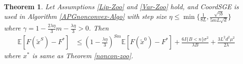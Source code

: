\documentclass{article}
\newcommand*{\E}{\mathbb{E}}
\newtheorem{theorem}{Theorem}[section]
\theoremstyle{definition}
\theoremstyle{remark}
\begin{document}
\begin{theorem}\label{PL-Zoo}
Let Assumptions \ref{Lip-Zoo} and \ref{Var-Zoo} hold, and  CoordSGE  is  used  in
 Algorithm \ref{APGnonconvex-Algo} with step size $\eta \leq \min\{\frac{1}{8L}, \frac{\sqrt{\gamma b}}{5 m L \sqrt{d}}\}$ where $\gamma = 1-\frac{2\lambda\eta}{3} m-\frac{\lambda\eta}{3} > 0$. Then 
\begin{equation}\label{PL-eq-error}
\begin{split}
\E[F(\tilde{x}^S) - {F}^*] & \leq   \left(1-\frac{\lambda\eta}{3}\right)^{Sm} \E[F(\tilde{x}^0) - {F}^*] + \frac{6I\{B < n\} \sigma ^2}{\lambda B}+\frac{3 L^2 d^2 \mu^2}{2\lambda}
\end{split}
\end{equation}
where $x^*$ is same as Theorem \ref{noncon-zoo}.
\end{theorem}
\end{document}
